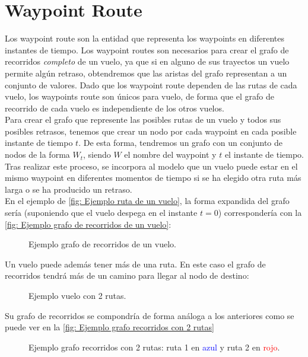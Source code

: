 \section{Waypoint Route}
Los waypoint route son la entidad que representa los waypoints en diferentes instantes de tiempo. Los waypoint routes son necesarios para crear el grafo de recorridos \textit{completo} de un vuelo, ya que si en alguno de sus trayectos un vuelo permite algún retraso, obtendremos que las aristas del grafo representan a un conjunto de valores. Dado que los waypoint route dependen de las rutas de cada vuelo, los waypoints route son únicos para vuelo, de forma que el grafo de recorrido de cada vuelo es independiente de los otros vuelos.\\

Para crear el grafo que represente las posibles rutas de un vuelo y todos sus posibles retrasos, tenemos que crear un nodo por cada waypoint en cada posible instante de tiempo $t$. De esta forma, tendremos un grafo con un conjunto de nodos de la forma $W_{t}$, siendo $W$ el nombre del waypoint y $t$ el instante de tiempo.\\
Tras realizar este proceso, se incorpora al modelo que un vuelo puede estar en el mismo waypoint en diferentes momentos de tiempo si se ha elegido otra ruta más larga o se ha producido un retraso.\\

En el ejemplo de \autoref{fig: Ejemplo ruta de un vuelo}, la forma expandida del grafo sería (suponiendo que el vuelo despega en el instante $t=0$) correspondería con la \autoref{fig: Ejemplo grafo de recorridos de un vuelo}:
\begin{figure}[h]
	\centering
	\scalebox{.6}{}
	\caption{Ejemplo grafo de recorridos de un vuelo.}
	\label{fig: Ejemplo grafo de recorridos de un vuelo}
\end{figure}


Un vuelo puede además tener más de una ruta. En este caso el grafo de recorridos tendrá más de un camino para llegar al nodo de destino:
\begin{figure}[h]
	\centering
	
	\caption{Ejemplo vuelo con 2 rutas.}
	\label{fig: Ejemplo vuelo con 2 rutas}
\end{figure}

Su grafo de recorridos se compondría de forma análoga a los anteriores como se puede ver en la \autoref{fig: Ejemplo grafo recorridos con 2 rutas}
\begin{figure}[]
	\centering
		\scalebox{1}{}
	\caption{Ejemplo grafo recorridos con 2 rutas: ruta 1 en \textcolor{blue}{azul} y ruta 2 en \textcolor{red}{rojo}.  }
	\label{fig: Ejemplo grafo recorridos con 2 rutas}
\end{figure}



